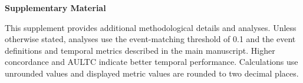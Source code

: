 %
%   
%

\clearpage
\begingroup

\renewcommand{\thettasuppsection}{S\arabic{ttasuppsection}}
\renewcommand{\thettasupptable}{S\arabic{ttasupptable}}

\newcommand{\TTASuppSection}[2]{%
  \par\vspace{0.8em}%
  \refstepcounter{ttasuppsection}\label{#2}%
  \noindent\textbf{\thettasuppsection. #1}\par\vspace{0.25em}%
}

\newcommand{\TTASuppTableCaption}[2]{%
  \refstepcounter{ttasupptable}\label{#1}%
  \noindent\textbf{Supplementary Table \thettasupptable.} #2\par\vspace{0.35em}%
}

\label{supp:material}
\begin{center}
{\LARGE\bfseries Supplementary Material}\par
\vspace{0.35em}
\end{center}

\vspace{0.5em}
This supplement provides additional methodological details and analyses. Unless otherwise stated, analyses use the event-matching threshold of 0.1 and the event definitions and temporal metrics described in the main manuscript. Higher concordance and AULTC indicate better temporal performance. Calculations use unrounded values and displayed metric values are rounded to two decimal places.

